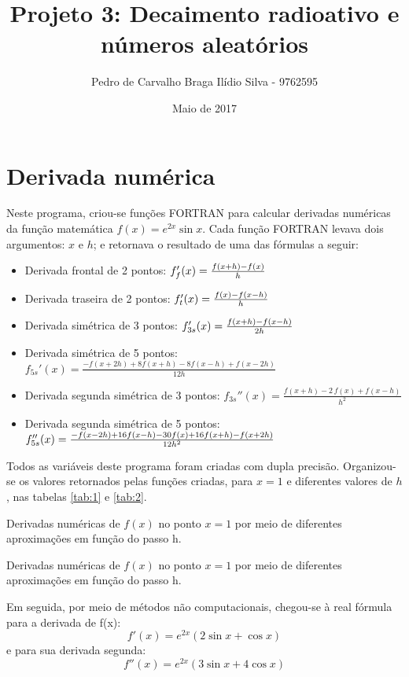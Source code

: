 \documentclass{article}
\title{Projeto 3: Decaimento radioativo e números aleatórios}
\author{Pedro de Carvalho Braga Ilídio Silva - 9762595}
\date{Maio de 2017}
\begin{document}
\maketitle

\section{Derivada numérica}

Neste programa, criou-se  funções FORTRAN para calcular derivadas numéricas da função matemática $f(x)=e^{2x}\sin{x}$. Cada função FORTRAN levava dois argumentos: $x$ e $h$; e retornava o resultado de uma das fórmulas a seguir:

\begin{itemize}
\item Derivada frontal de 2 pontos: \(f_f'(x)={f(x+h)-f(x) \over h}\)
\item Derivada traseira de 2 pontos: \(f_t'(x)={f(x)-f(x-h) \over h}\)
\item Derivada simétrica de 3 pontos: \(f_{3s}'(x)={f(x+h)-f(x-h) \over 2h}\)
\item Derivada simétrica de 5 pontos: \(f_{5s}'(x)={\frac {-f(x+2h)+8f(x+h)-8f(x-h)+f(x-2h)}{12h}}\)
\item Derivada segunda simétrica de 3 pontos: \(f_{3s}''(x)=\frac{f(x+h)-2\,f(x)+f(x-h)}{h^2}\)
\item Derivada segunda simétrica de 5 pontos: \(f_{5s}''(x) ={ -f (x - 2h) + 16f (x - h) - 30f (x) + 16f (x + h) - f (x + 2h)\over 12h^2}\)
\end{itemize}

Todos as variáveis deste programa foram criadas com dupla precisão.
Organizou-se os valores retornados pelas funções criadas, para $x = 1$ e diferentes valores de $h$, nas tabelas \ref{tab:1} e \ref{tab:2}.

\begin{table}[h]
  \centering
  
  \caption{Derivadas numéricas de $f(x)$ no ponto $x = 1$ por meio de diferentes aproximações em função do passo h.}
  \label{tab:1}
\end{table}

\begin{table}[h]
  \centering
  
  \caption{Derivadas numéricas de $f (x)$ no ponto $x = 1$ por meio de diferentes aproximações em função do passo h.}
  \label{tab:2}
\end{table}

Em seguida, por meio de métodos não computacionais, chegou-se à real fórmula para a derivada de f(x):
\[f'(x)=e^{2x}(2\sin{x}+\cos{x})\]
e para sua derivada segunda:
\[f''(x)=e^{2x}(3\sin{x}+4\cos{x})\]
\end{document}

